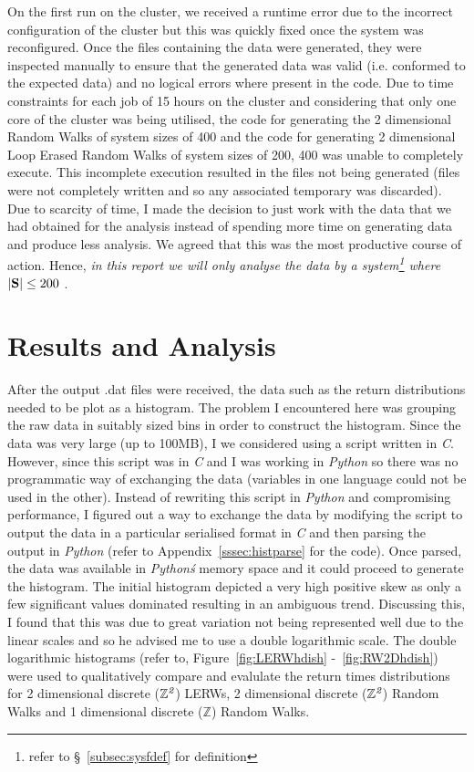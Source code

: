 \documentclass{article}
\begin{document}
On the first run on the cluster, we received a runtime error due to the incorrect configuration of the cluster but this was quickly fixed once the system was reconfigured. Once the files containing the data were generated, they were inspected manually to ensure that the generated data was valid (i.e. conformed to the expected data) and no logical errors where present in the code. Due to time constraints for each job of 15 hours on the cluster and considering that only one core of the cluster was being utilised, the code for generating the 2 dimensional Random Walks of system sizes of 400 and the code for generating 2 dimensional Loop Erased Random Walks of system sizes of 200, 400 was unable to completely execute. This incomplete execution resulted in the files not being generated (files were not completely written and so any associated temporary was discarded). Due to scarcity of time, I made the decision to just work with the data that we had obtained for the analysis instead of spending more time on generating data and produce less analysis. We agreed that this was the most productive course of action. Hence, \emph{in this report we will only analyse the data by a system\footnote{refer to \S~\ref{subsec:sysfdef} for definition} where} $|\vb{S}| \le 200$ .\newline

\section{Results and Analysis}
After the output .dat files were received, the data such as the return distributions needed to be plot as a histogram. The problem I encountered here was grouping the raw data in suitably sized bins in order to construct the histogram. Since the data was very large (up to 100MB), I we considered using a script written in \textit{C}. However, since this script was in \textit{C} and I was working in \textit{Python} so there was no programmatic way of exchanging the data (variables in one language could not be used in the other). Instead of rewriting this script in \textit{Python} and compromising performance, I figured out a way to exchange the data by modifying the script to output the data in a particular serialised format in \textit{C} and then parsing the output in \textit{Python} (refer to Appendix~\ref{sssec:histparse} for the code). Once parsed, the data was available in \textit{Python\'s} memory space and it could proceed to generate the histogram. The initial histogram depicted a very high positive skew as only a few significant values dominated resulting in an ambiguous trend. Discussing this, I found that this was due to great variation not being represented well due to the linear scales and so he advised me to use a double logarithmic scale.
	The double logarithmic histograms (refer to, Figure~\ref{fig:LERWhdish} -~\ref{fig:RW2Dhdish}) were used to qualitatively compare and evalulate the return times distributions for 2 dimensional discrete ($\mathbb{Z}^{\emph{2}}$) LERWs, 2 dimensional discrete ($\mathbb{Z}^{\emph{2}}$) Random Walks and 1 dimensional discrete ($\mathbb{Z}$) Random Walks. \newline
\end{document}
